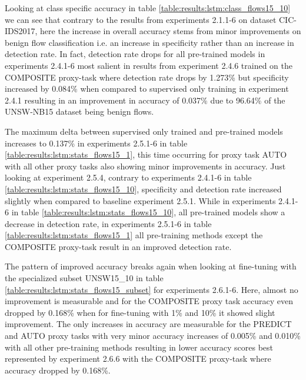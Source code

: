 Looking at class specific accuracy in table \ref{table:results:lstm:class_flows15_10} we can see that contrary to the results from experiments 2.1.1-6 on dataset CIC-IDS2017, here the increase in overall accuracy stems from minor improvements on benign flow classification i.e. an increase in specificity rather than an increase in detection rate. In fact, detection rate drops for all pre-trained models in experiments 2.4.1-6 most salient in results from experiment 2.4.6 trained on the COMPOSITE proxy-task where detection rate drops by 1.273\% but specificity increased by 0.084\% when compared to supervised only training in experiment 2.4.1 resulting in an improvement in accuracy of 0.037\% due to 96.64\% of the UNSW-NB15 dataset being benign flows. \par



The maximum delta between supervised only trained and pre-trained models increases to 0.137\% in experiments 2.5.1-6 in table \ref{table:results:lstm:stats_flows15_1}, this time occurring for proxy task AUTO with all other proxy tasks also showing minor improvements in accuracy. Just looking at experiment 2.5.4, contrary to experiments 2.4.1-6 in table  \ref{table:results:lstm:stats_flows15_10}, specificity and detection rate increased slightly when compared to baseline experiment 2.5.1. While in experiments 2.4.1-6 in table \ref{table:results:lstm:stats_flows15_10}, all pre-trained models show a decrease in detection rate, in experiments 2.5.1-6 in table  \ref{table:results:lstm:stats_flows15_1} all pre-training methods except the COMPOSITE proxy-task result in an improved detection rate. \par



The pattern of improved accuracy breaks again when looking at fine-tuning with the specialized subset UNSW15\_10 in table \ref{table:results:lstm:stats_flows15_subset} for experiments 2.6.1-6. Here, almost no improvement is measurable and for the COMPOSITE proxy task accuracy even dropped by 0.168\% when for fine-tuning with 1\% and 10\% it showed slight improvement. The only increases in accuracy are measurable for the PREDICT and AUTO proxy tasks with very minor accuracy increases of 0.005\% and 0.010\% with all other pre-training methods resulting in lower accuracy scores best represented by experiment 2.6.6 with the COMPOSITE proxy-task where accuracy dropped by 0.168\%. \par

